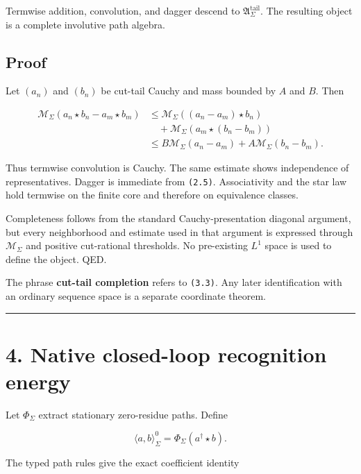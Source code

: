 Termwise addition, convolution, and dagger descend to
\(\mathfrak A_\Sigma^{\mathrm{tail}}\). The resulting object is a complete
involutive path algebra.

\hypertarget{proof-3}{%
\subsection{Proof}\label{proof-3}}

Let \((a_n)\) and \((b_n)\) be cut-tail Cauchy and mass bounded by \(A\) and
\(B\). Then

\[
\begin{aligned}
\mathcal M_\Sigma(a_n\star b_n-a_m\star b_m)
&\le
\mathcal M_\Sigma((a_n-a_m)\star b_n)\\
&\quad+
\mathcal M_\Sigma(a_m\star(b_n-b_m))\\
&\le
B\mathcal M_\Sigma(a_n-a_m)
+A\mathcal M_\Sigma(b_n-b_m).
\end{aligned}
\tag{3.4}
\]

Thus termwise convolution is Cauchy. The same estimate shows independence of
representatives. Dagger is immediate from \texttt{(2.5)}. Associativity and the star
law hold termwise on the finite core and therefore on equivalence classes.

Completeness follows from the standard Cauchy-presentation diagonal argument,
but every neighborhood and estimate used in that argument is expressed through
\(\mathcal M_\Sigma\) and positive cut-rational thresholds. No pre-existing
\(L^1\) space is used to define the object. QED.

The phrase \textbf{cut-tail completion} refers to \texttt{(3.3)}. Any later identification
with an ordinary sequence space is a separate coordinate theorem.

\begin{center}\rule{0.5\linewidth}{0.5pt}\end{center}

\hypertarget{native-closed-loop-recognition-energy}{%
\section{4. Native closed-loop recognition energy}\label{native-closed-loop-recognition-energy}}

Let \(\Phi_\Sigma\) extract stationary zero-residue paths. Define

\[
\langle a,b\rangle_\Sigma^0
=
\Phi_\Sigma(a^\dagger\star b).
\tag{4.1}
\]

The typed path rules give the exact coefficient identity

